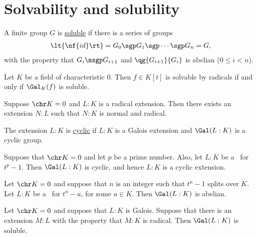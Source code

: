 \documentclass{article}
\begin{document}
\section{Solvability and solubility}
  \begin{tdefinition}
    A finite group \( G \) is \ul{soluble} if there is a series of groups \begin{align*}
      \lt\{ \nf{id} \rt\} = G_0 \sgp G_1 \sgp \cdots\sgp G_n = G,
    \end{align*}
    with the property that \( G_i \nsgp G_{i+1} \) and \( \qg{G_{i+1}}{G_i} \) is abelian (\( 0\leq i < n \)).
  \end{tdefinition}

  \begin{ttheorem}
    Let \( K \) be a field of characteristic 0.
    Then \( f\in K[t] \) is solvable by radicals if and only if \( \Gal_K(f) \) is soluble.
  \end{ttheorem}

  \begin{tlemma}
    Suppose \( \chr K = 0 \) and \( L:K \) is a radical extension.
    Then there exists an extension \( N:L \) such that \( N:K \) is normal and radical.
  \end{tlemma}

  \begin{tdefinition}
    The extension \( L:K \) is \ul{cyclic} if \( L:K \) is a Galois extension and \( \Gal(L:K) \) is a cyclic group.
  \end{tdefinition}

  \begin{tlemma}
    Suppose that \( \chr K = 0 \) and let \( p \) be a prime number.
    Also, let \( L:K \) be a \sfe~for \( t^p-1 \).
    Then \( \Gal(L:K) \) is cyclic, and hence \( L:K \) is a cyclic extension.
  \end{tlemma}

  \begin{tlemma}
    Let \( \chr K = 0 \) and suppose that \( n \) is an integer such that \( t^n-1 \) splits over \( K \).
    Let \( L:K \) be a \sfe~for \( t^n-a \), for some \( a\in K \).
    Then \( \Gal(L:K) \) is abelian.
  \end{tlemma}

  \begin{ttheorem}
    Let \( \chr K = 0 \) and suppose that \( L:K \) is Galois.
    Suppose that there is an extension \( M:L \) with the property that \( M:K \) is radical.
    Then \( \Gal(L:K) \) is soluble.
  \end{ttheorem}
\end{document}
